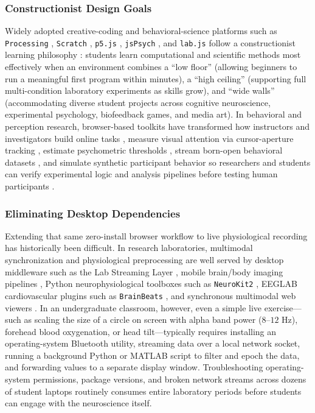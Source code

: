 \documentclass[11pt]{article}
\begin{document}
\subsubsection{Constructionist Design Goals}
Widely adopted creative-coding and behavioral-science platforms such as \texttt{Processing} \citep{reas2007processing}, \texttt{Scratch} \citep{resnick2009scratch}, \texttt{p5.js} \citep{mccarthy2015p5}, \texttt{jsPsych} \citep{deleeuw2015jspsych,deleeuw2023simulating,deleeuw2024datapipe}, and \texttt{lab.js} \citep{henninger2022labjs} follow a constructionist learning philosophy \citep{papert1980mindstorms}: students learn computational and scientific methods most effectively when an environment combines a ``low floor'' (allowing beginners to run a meaningful first program within minutes), a ``high ceiling'' (supporting full multi-condition laboratory experiments as skills grow), and ``wide walls'' (accommodating diverse student projects across cognitive neuroscience, experimental psychology, biofeedback games, and media art). In behavioral and perception research, browser-based toolkits have transformed how instructors and investigators build online tasks \citep{woods2015conducting}, measure visual attention via cursor-aperture tracking \citep{dalmaijer2022mouseview}, estimate psychometric thresholds \citep{pronk2023jsquestplus}, stream born-open behavioral datasets \citep{deleeuw2024datapipe}, and simulate synthetic participant behavior so researchers and students can verify experimental logic and analysis pipelines before testing human participants \citep{deleeuw2023simulating}.

\subsubsection{Eliminating Desktop Dependencies}
Extending that same zero-install browser workflow to live physiological recording has historically been difficult. In research laboratories, multimodal synchronization and physiological preprocessing are well served by desktop middleware such as the Lab Streaming Layer \citep{kothe2025lsl}, mobile brain/body imaging pipelines \citep{klug2022bemobil}, Python neurophysiological toolboxes such as \texttt{NeuroKit2} \citep{makowski2021neurokit2}, EEGLAB cardiovascular plugins such as \texttt{BrainBeats} \citep{cannard2024brainbeats}, and synchronous multimodal web viewers \citep{pijalek2026meedav}. In an undergraduate classroom, however, even a simple live exercise---such as scaling the size of a circle on screen with alpha band power ($8\text{--}12\text{ Hz}$), forehead blood oxygenation, or head tilt---typically requires installing an operating-system Bluetooth utility, streaming data over a local network socket, running a background Python or MATLAB script to filter and epoch the data, and forwarding values to a separate display window. Troubleshooting operating-system permissions, package versions, and broken network streams across dozens of student laptops routinely consumes entire laboratory periods before students can engage with the neuroscience itself.
\end{document}
